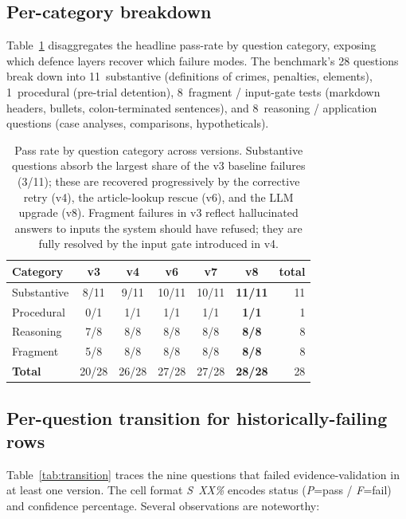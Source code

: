 \documentclass[final,1p,times]{elsarticle}
\newcommand{\thead}[1]{\textbf{#1}}                 %
\begin{document}
\subsection{Per-category breakdown}

Table~\ref{tab:bycat} disaggregates the headline pass-rate by question
category, exposing which defence layers recover which failure modes. The
benchmark's 28 questions break down into 11~substantive (definitions of
crimes, penalties, elements), 1~procedural (pre-trial detention),
8~fragment / input-gate tests (markdown headers, bullets, colon-terminated
sentences), and 8~reasoning / application questions (case analyses,
comparisons, hypotheticals).

\begin{table}[!htb]
\centering
\small
\caption{Pass rate by question category across versions. Substantive
questions absorb the largest share of the v3 baseline failures (3/11); these
are recovered progressively by the corrective retry (v4), the article-lookup
rescue (v6), and the LLM upgrade (v8). Fragment failures in v3 reflect
hallucinated answers to inputs the system should have refused; they are
fully resolved by the input gate introduced in v4.}
\label{tab:bycat}
\setlength{\tabcolsep}{5pt}
\renewcommand{\arraystretch}{1.15}
\begin{tabular}{lcccccr}
\toprule
\rowcolor{tabhead}
\thead{Category} & \thead{v3} & \thead{v4} & \thead{v6} & \thead{v7} & \thead{v8} & \thead{total} \\
\midrule
Substantive    & 8/11  & 9/11  & 10/11  & 10/11  & \textbf{11/11} & 11 \\
Procedural     & 0/1   & 1/1   & 1/1    & 1/1    & \textbf{1/1}   & 1  \\
Reasoning      & 7/8   & 8/8   & 8/8    & 8/8    & \textbf{8/8}   & 8  \\
Fragment       & 5/8   & 8/8   & 8/8    & 8/8    & \textbf{8/8}   & 8  \\
\midrule
\textbf{Total} & 20/28 & 26/28 & 27/28  & 27/28  & \textbf{28/28} & 28 \\
\bottomrule
\end{tabular}
\end{table}

\subsection{Per-question transition for historically-failing rows}

Table~\ref{tab:transition} traces the nine questions that failed
evidence-validation in at least one version. The cell format \emph{S~XX\%}
encodes status (\emph{P}=pass / \emph{F}=fail) and confidence percentage.
Several observations are noteworthy:
\end{document}
